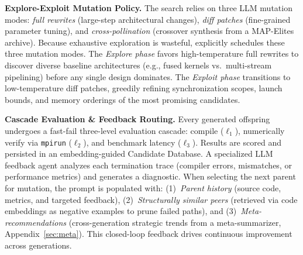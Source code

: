 \noindent\textbf{Explore-Exploit Mutation Policy.} The search relies on three LLM mutation modes: \emph{full rewrites} (large-step architectural changes), \emph{diff patches} (fine-grained parameter tuning), and \emph{cross-pollination} (crossover synthesis from a MAP-Elites~\cite{mapelites} archive). Because exhaustive exploration is wasteful, \cufuse{} explicitly schedules these three mutation modes. The \emph{Explore phase} favors high-temperature full rewrites to discover diverse baseline architectures (e.g., fused kernels vs.\ multi-stream pipelining) before any single design dominates. The \emph{Exploit phase} transitions to low-temperature diff patches, greedily refining synchronization scopes, launch bounds, and memory orderings of the most promising candidates.

\noindent\textbf{Cascade Evaluation \& Feedback Routing.}
Every generated offspring undergoes a fast-fail three-level evaluation cascade: compile ($\ell_1$), numerically verify via \texttt{mpirun} ($\ell_2$), and benchmark latency ($\ell_3$). Results are scored and persisted in an embedding-guided Candidate Database. A specialized LLM feedback agent analyzes each termination trace (compiler errors, mismatches, or performance metrics) and generates a diagnostic. When selecting the next parent for mutation, the prompt is populated with: (1)~\emph{Parent history} (source code, metrics, and targeted feedback), (2)~\emph{Structurally similar peers} (retrieved via code embeddings as negative examples to prune failed paths), and (3)~\emph{Meta-recommendations} (cross-generation strategic trends from a meta-summarizer, Appendix~\ref{sec:meta}). This closed-loop feedback drives continuous improvement across generations.

\par
